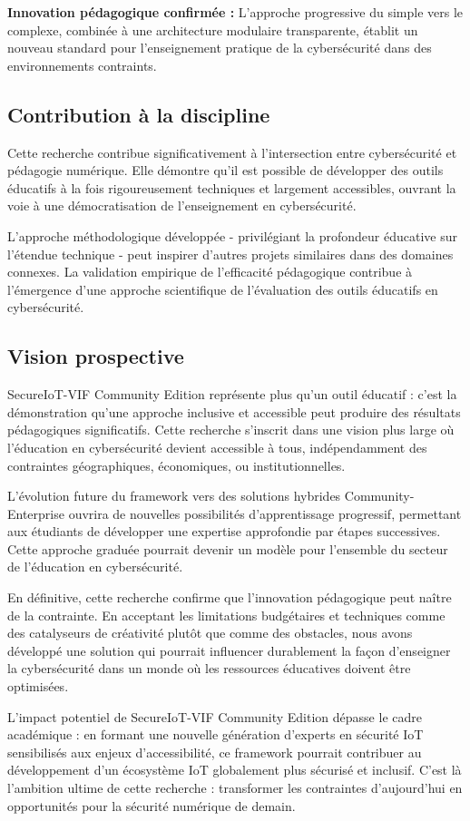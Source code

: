 \textbf{Innovation pédagogique confirmée :} L'approche progressive du simple vers le complexe, combinée à une architecture modulaire transparente, établit un nouveau standard pour l'enseignement pratique de la cybersécurité dans des environnements contraints.

\subsection{Contribution à la discipline}

Cette recherche contribue significativement à l'intersection entre cybersécurité et pédagogie numérique. Elle démontre qu'il est possible de développer des outils éducatifs à la fois rigoureusement techniques et largement accessibles, ouvrant la voie à une démocratisation de l'enseignement en cybersécurité.

L'approche méthodologique développée - privilégiant la profondeur éducative sur l'étendue technique - peut inspirer d'autres projets similaires dans des domaines connexes. La validation empirique de l'efficacité pédagogique contribue à l'émergence d'une approche scientifique de l'évaluation des outils éducatifs en cybersécurité.

\subsection{Vision prospective}

SecureIoT-VIF Community Edition représente plus qu'un outil éducatif : c'est la démonstration qu'une approche inclusive et accessible peut produire des résultats pédagogiques significatifs. Cette recherche s'inscrit dans une vision plus large où l'éducation en cybersécurité devient accessible à tous, indépendamment des contraintes géographiques, économiques, ou institutionnelles.

L'évolution future du framework vers des solutions hybrides Community-Enterprise ouvrira de nouvelles possibilités d'apprentissage progressif, permettant aux étudiants de développer une expertise approfondie par étapes successives. Cette approche graduée pourrait devenir un modèle pour l'ensemble du secteur de l'éducation en cybersécurité.

En définitive, cette recherche confirme que l'innovation pédagogique peut naître de la contrainte. En acceptant les limitations budgétaires et techniques comme des catalyseurs de créativité plutôt que comme des obstacles, nous avons développé une solution qui pourrait influencer durablement la façon d'enseigner la cybersécurité dans un monde où les ressources éducatives doivent être optimisées.

L'impact potentiel de SecureIoT-VIF Community Edition dépasse le cadre académique : en formant une nouvelle génération d'experts en sécurité IoT sensibilisés aux enjeux d'accessibilité, ce framework pourrait contribuer au développement d'un écosystème IoT globalement plus sécurisé et inclusif. C'est là l'ambition ultime de cette recherche : transformer les contraintes d'aujourd'hui en opportunités pour la sécurité numérique de demain.